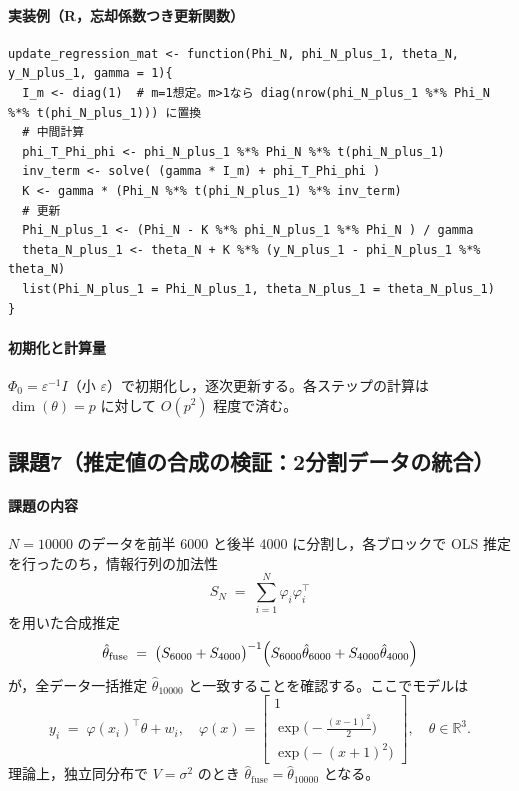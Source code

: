\paragraph{実装例（R，忘却係数つき更新関数）}
\begin{lstlisting}
update_regression_mat <- function(Phi_N, phi_N_plus_1, theta_N, y_N_plus_1, gamma = 1){
  I_m <- diag(1)  # m=1想定。m>1なら diag(nrow(phi_N_plus_1 %*% Phi_N %*% t(phi_N_plus_1))) に置換
  # 中間計算
  phi_T_Phi_phi <- phi_N_plus_1 %*% Phi_N %*% t(phi_N_plus_1)
  inv_term <- solve( (gamma * I_m) + phi_T_Phi_phi )
  K <- gamma * (Phi_N %*% t(phi_N_plus_1) %*% inv_term)
  # 更新
  Phi_N_plus_1 <- (Phi_N - K %*% phi_N_plus_1 %*% Phi_N ) / gamma
  theta_N_plus_1 <- theta_N + K %*% (y_N_plus_1 - phi_N_plus_1 %*% theta_N)
  list(Phi_N_plus_1 = Phi_N_plus_1, theta_N_plus_1 = theta_N_plus_1)
}
\end{lstlisting}

\paragraph{初期化と計算量}
$\Phi_0=\varepsilon^{-1}I$（小 $\varepsilon$）で初期化し，逐次更新する。各ステップの計算は
$\dim(\theta)=p$ に対して $O(p^2)$ 程度で済む。\cite{exp2025}

\subsection{課題7（推定値の合成の検証：2分割データの統合）}

\paragraph{課題の内容}
$N=10000$ のデータを前半 $6000$ と後半 $4000$ に分割し，各ブロックで OLS 推定を行ったのち，情報行列の加法性
\[
  S_N \;=\; \sum_{i=1}^N \varphi_i \varphi_i^\top
\]
を用いた合成推定
\[
  \hat\theta_{\mathrm{fuse}}
  \;=\;
  \bigl(S_{6000}+S_{4000}\bigr)^{-1}
  \Bigl(S_{6000}\hat\theta_{6000}+S_{4000}\hat\theta_{4000}\Bigr)
\]
が，全データ一括推定 $\hat\theta_{10000}$ と一致することを確認する。ここでモデルは
\[
  y_i \;=\; \varphi(x_i)^\top \theta + w_i,\quad
  \varphi(x)=
  \begin{bmatrix}
    1\\[1mm]
    \exp\!\bigl(-\tfrac{(x-1)^2}{2}\bigr)\\[1mm]
    \exp\!\bigl(-(x+1)^2\bigr)
  \end{bmatrix}\!,
\quad \theta\in\mathbb{R}^3.
\]
理論上，独立同分布で $V=\sigma^2$ のとき $\hat\theta_{\mathrm{fuse}}=\hat\theta_{10000}$ となる。\cite{exp2025}

